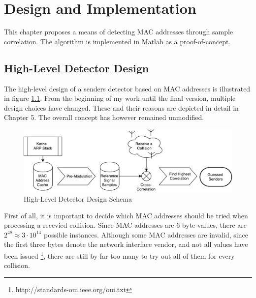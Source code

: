 
\chapter{Design and Implementation}\label{ch:design}
\glsresetall %

This chapter proposes a means of detecting MAC addresses through sample correlation. The algorithm is implemented in Matlab as a proof-of-concept.



\section{High-Level Detector Design}

The high-level design of a senders detector based on MAC addresses is illustrated in figure \ref{fig:blockdesign}. From the beginning of my work until the final version, multiple design choices have changed. These and their reasons are depicted in detail in Chapter 5. The overall concept has however remained unmodified.

\begin{figure}[H]
	\centering
	\includegraphics[width=\textwidth]{gfx/images/detector-block-design}
	\caption[High-Level Detector Design Schema]{High-Level Detector Design Schema}
	\label{fig:blockdesign}
\end{figure}

First of all, it is important to decide which MAC addresses should be tried when processing a recevied collision. Since MAC addresses are 6 byte values, there are $2^{48} \approx 3 \cdot 10^{14}$ possible instances. Although some MAC addresses are invalid, since the first three bytes denote the network interface vendor, and not all values have been issued \footnote{http://standards-oui.ieee.org/oui.txt}, there are still by far too many to try out all of them for every collision.


